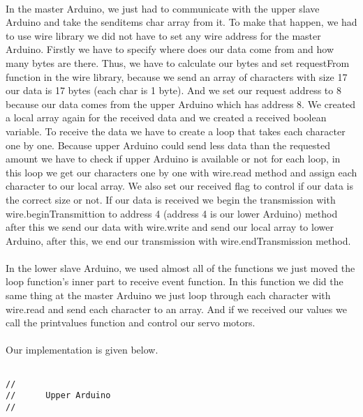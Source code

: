 \documentclass[pdftex,12pt,a4paper]{article}
\begin{document}
\begin{flushleft}
\paragraph{}
In the master Arduino, we just had to communicate with the upper slave Arduino and take the senditems char array from it. To make that happen, we had to use wire library we did not have to set any wire address for the master Arduino. Firstly we have to specify where does our data come from and how many bytes are there. Thus, we have to calculate our bytes and set requestFrom function in the wire library, because we send an array of characters with size 17 our data is 17 bytes (each char is 1 byte). And we set our request address to 8 because our data comes from the upper Arduino which has address 8. We created a local array again for the received data and we created a received boolean variable. To receive the data we have to create a loop that takes each character one by one. Because upper Arduino could send less data than the requested amount we have to check if upper Arduino is available or not for each loop, in this loop we get our characters one by one with wire.read method and assign each character to our local array. We also set our received flag to control if our data is the correct size or not. If our data is received we begin the transmission with wire.beginTransmittion to address 4 (address 4 is our lower Arduino) method after this we send our data with wire.write and send our local array to lower Arduino, after this, we end our transmission with wire.endTransmission method.

\paragraph{}
In the lower slave Arduino, we used almost all of the functions we just moved the loop function's inner part to receive event function. In this function we did the same thing at the master Arduino we just loop through each character with wire.read and send each character to an array. And if we received our values we call the printvalues function and control our servo motors.


\paragraph{}
Our implementation is given below.

\begin{lstlisting}[language=Arduino]

//
//      Upper Arduino
//


\end{lstlisting}
\end{flushleft}
\end{document}
